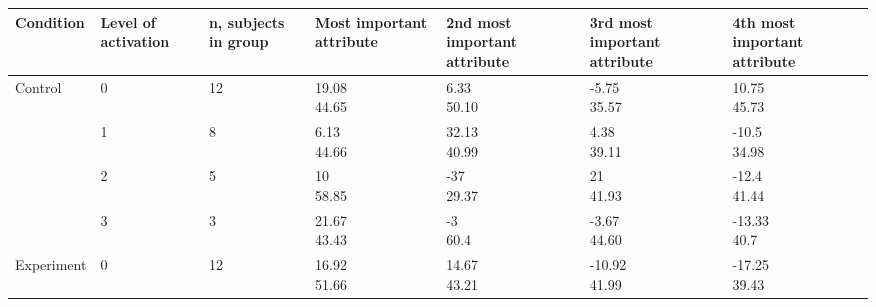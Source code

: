 



\begin{table*}
  \centering

  \begingroup
    \footnotesize
    \begin{tabularx}{\textwidth}{XXXXXXX}
      \toprule
      
      Condition
      & Level of activation
      & n, subjects in group
      & Most important attribute
      & 2nd most important attribute
      & 3rd most important attribute
      & 4th most important attribute
      \\

      \midrule


      Control
      & 0
      & 12
      & \cellcontent{19.08\\44.65}
      & \cellcontent{6.33\\50.10}
      & \cellcontent{-5.75\\35.57}
      & \cellcontent{10.75\\45.73}
      \\

      & 1
      & 8
      & \cellcontent{6.13\\44.66}
      & \cellcontent{32.13\\40.99}
      & \cellcontent{4.38\\39.11}
      & \cellcontent{-10.5\\34.98}
      \\

      & 2
      & 5
      & \cellcontent{10\\58.85}
      & \cellcontent{-37\\29.37}
      & \cellcontent{21\\41.93}
      & \cellcontent{-12.4\\41.44}
      \\

      & 3
      & 3
      & \cellcontent{21.67\\43.43}
      & \cellcontent{-3\\60.4}
      & \cellcontent{-3.67\\44.60}
      & \cellcontent{-13.33\\40.7}
      \\

      Experiment
      & 0
      & 12
      & \cellcontent{16.92\\51.66}
      & \cellcontent{14.67\\43.21}
      & \cellcontent{-10.92\\41.99}
      & \cellcontent{-17.25\\39.43}
      \\


\end{tabularx}
\end{table*}

